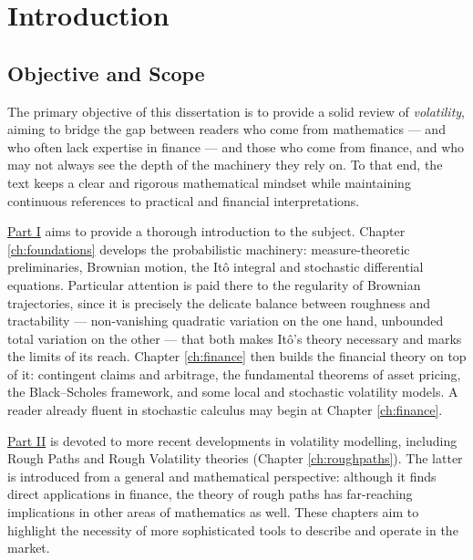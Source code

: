 \chapter*{Introduction} \label{ch:introduction}

\setcounter{section}{0}
\renewcommand{\thesection}{\arabic{section}}



\section{Objective and Scope}


The primary objective of this dissertation is to provide a solid review of \textit{volatility}, aiming to bridge the gap between readers who come from mathematics --- and who often lack expertise in finance --- and those who come from finance, and who may not always see the depth of the machinery they rely on. To that end, the text keeps a clear and rigorous mathematical mindset while maintaining continuous references to practical and financial interpretations.




\hyperref[part:part1]{Part I} aims to provide a thorough introduction to the subject. Chapter \ref{ch:foundations} develops the probabilistic machinery: measure-theoretic preliminaries, Brownian motion, the Itô integral and stochastic differential equations. Particular attention is paid there to the regularity of Brownian trajectories, since it is precisely the delicate balance between roughness and tractability --- non-vanishing quadratic variation on the one hand, unbounded total variation on the other --- that both makes Itô's theory necessary and marks the limits of its reach. Chapter \ref{ch:finance} then builds the financial theory on top of it: contingent claims and arbitrage, the fundamental theorems of asset pricing, the Black--Scholes framework, and some local and stochastic volatility models. A reader already fluent in stochastic calculus may begin at Chapter \ref{ch:finance}.

\hyperref[part:part2]{Part II} is devoted to more recent developments in volatility modelling, including Rough Paths and Rough Volatility theories (Chapter \ref{ch:roughpaths}). The latter is introduced from a general and mathematical perspective: although it finds direct applications in finance, the theory of rough paths has far-reaching implications in other areas of mathematics as well. These chapters aim to highlight the necessity of more sophisticated tools to describe and operate in the market.


